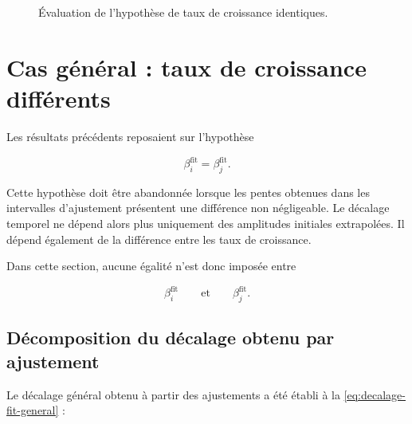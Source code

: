 \documentclass[
    11pt,
    a4paper
]{article}
\begin{document}
\begin{figure}[H]
    \centering
    \caption{Évaluation de l’hypothèse de taux de croissance identiques.}
    \label{fig:evaluation-beta-identiques}
\end{figure}




\section{Cas général : taux de croissance différents}
\label{sec:beta-differents}

Les résultats précédents reposaient sur l’hypothèse

\begin{equation}
    \beta_i^{\mathrm{fit}}
    =
    \beta_j^{\mathrm{fit}}.
\end{equation}

Cette hypothèse doit être abandonnée lorsque les pentes obtenues dans les
intervalles d’ajustement présentent une différence non négligeable. Le décalage
temporel ne dépend alors plus uniquement des amplitudes initiales extrapolées.
Il dépend également de la différence entre les taux de croissance.

Dans cette section, aucune égalité n’est donc imposée entre

\begin{equation}
    \beta_i^{\mathrm{fit}}
    \qquad \text{et} \qquad
    \beta_j^{\mathrm{fit}}.
\end{equation}

\subsection{Décomposition du décalage obtenu par ajustement}
\label{subsec:decomposition-fit-beta-differents}

Le décalage général obtenu à partir des ajustements a été établi à la
\ref{eq:decalage-fit-general} :
\end{document}
